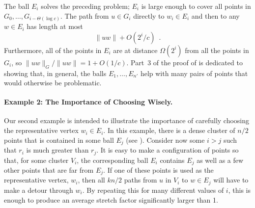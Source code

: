 \documentclass{patmorin}
\begin{document}
\begin{figure}
  \begin{minipage}{.47\textwidth}
  \end{minipage}
  \hspace{.06\textwidth}
  \begin{minipage}{.47\textwidth}
  \end{minipage}
\end{figure}

The ball $E_i$ solves the preceding problem; $E_i$ is large enough
to cover all points in $G_0,\ldots,G_{i-\Theta(\log c)}$.  The path
from $u\in G_i$ directly to $w_i\in E_i$ and then to any $w\in E_i$
has length at most
\[
    \|uw\| + O(2^{i}/c) \enspace .
\]
Furthermore, all of the points in $E_i$ are at distance $\Omega(2^i)$ from
all the points in $G_i$, so $\|uw\|_G/\|uw\| = 1+O(1/c)$.  Part~3 of the
proof of  is dedicated to showing that, in general,
the balls $E_1,\ldots,E_{n'}$ help with many pairs of points that would
otherwise be problematic.
\paragraph{Example 2: The Importance of Choosing Wisely.}
Our second example is intended to illustrate the importance of carefully
choosing the representative vertex $w_i\in E_i$.   In this example, there
is a dense cluster of $n/2$ points that is contained in some ball $E_j$
(see ).  Consider now some $i>j$ such that $r_i$ is
much greater than $r_j$.  It is easy to make a configuration of points so
that, for some cluster $V_i$, the corresponding ball $E_i$ contains $E_j$
as well as a few other points that are far from $E_j$. If one of these
points is used as the representative vertex, $w_i$, then all $kn/2$ paths
from $u$ in $V_i$ to $w\in E_j$ will have to make a detour through $w_i$.
By repeating this for many different values of $i$, this is enough to
produce an average stretch factor significantly larger than 1.
\end{document}
